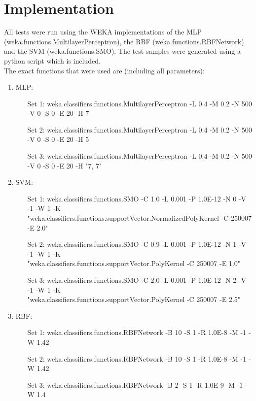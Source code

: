 \documentclass{article}
\begin{document}
	\pagebreak
\section{Implementation}\label{S4}
	All tests were run using the WEKA implementations of the MLP (weka.functions.MultilayerPerceptron), the RBF (weka.functions.RBFNetwork) and the SVM (weka.functions.SMO). The test samples were generated using a python script which is included. \\
	
	The exact functions that were used are (including all parameters):\\
	\begin{enumerate}
		\item MLP:
		\begin{enumerate}
			\item[Set 1:] weka.classifiers.functions.MultilayerPerceptron -L 0.4 -M 0.2 -N 500 -V 0 -S 0 -E 20 -H 7
			\item[Set 2:] weka.classifiers.functions.MultilayerPerceptron -L 0.4 -M 0.2 -N 500 -V 0 -S 0 -E 20 -H 5
			\item[Set 3:] weka.classifiers.functions.MultilayerPerceptron -L 0.4 -M 0.2 -N 500 -V 0 -S 0 -E 20 -H "7, 7"
		\end{enumerate}
		\item SVM:
		\begin{enumerate}
			\item[Set 1:] weka.classifiers.functions.SMO -C 1.0 -L 0.001 -P 1.0E-12 -N 0 -V -1 -W 1 -K\\ "weka.classifiers.functions.supportVector.NormalizedPolyKernel -C 250007 -E 2.0"
			\item[Set 2:] weka.classifiers.functions.SMO -C 0.9 -L 0.001 -P 1.0E-12 -N 1 -V -1 -W 1 -K\\ "weka.classifiers.functions.supportVector.PolyKernel -C 250007 -E 1.0"
			\item[Set 3:] weka.classifiers.functions.SMO -C 2.0 -L 0.001 -P 1.0E-12 -N 2 -V -1 -W 1 -K\\ "weka.classifiers.functions.supportVector.PolyKernel -C 250007 -E 2.5"
		\end{enumerate}
		\item RBF:
		\begin{enumerate}
			\item[Set 1:] weka.classifiers.functions.RBFNetwork -B 10 -S 1 -R 1.0E-8 -M -1 -W 1.42
			\item[Set 2:] weka.classifiers.functions.RBFNetwork -B 10 -S 1 -R 1.0E-8 -M -1 -W 1.42
			\item[Set 3:] weka.classifiers.functions.RBFNetwork -B 2 -S 1 -R 1.0E-9 -M -1 -W 1.4
		\end{enumerate}
	\end{enumerate}
\end{document}
